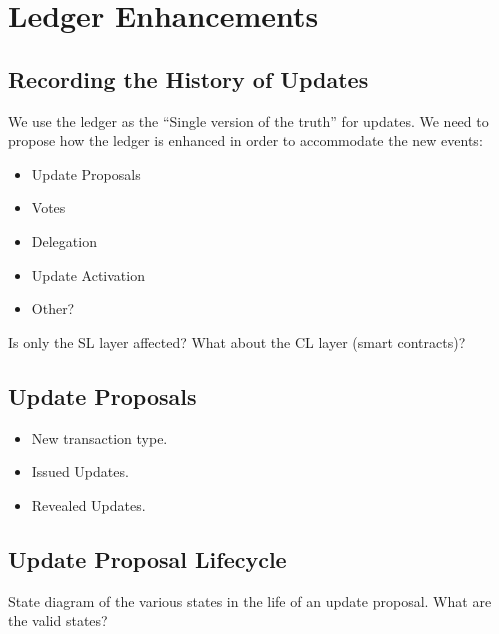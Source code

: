 \section{Ledger Enhancements}

\subsection*{Recording the History of Updates}
We use the ledger as the “Single version of the truth” for updates.
We need to propose how the ledger is enhanced in order to accommodate the new events:
\begin{itemize}
\item Update Proposals
\item Votes
\item Delegation
\item Update Activation
\item Other?
\end{itemize}
Is only the SL layer affected? What about the CL layer (smart contracts)?

\subsection*{Update Proposals}
\begin{itemize}
\item New transaction type. 
\item Issued Updates. 
\item Revealed Updates.
\end{itemize}

\subsection*{Update Proposal Lifecycle}
State diagram of the various states in the life of an update proposal. What are the valid states?
